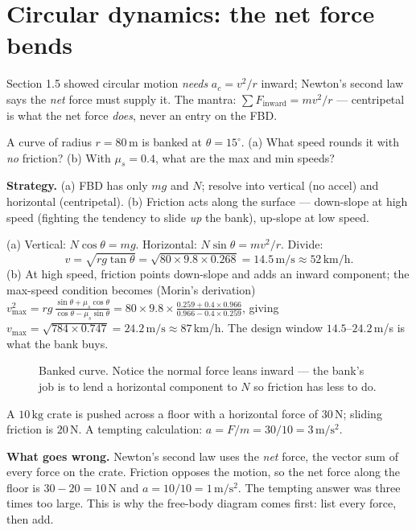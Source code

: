 \section{Circular dynamics: the net force bends}\label{sec:new-circ}

Section 1.5 showed circular motion \emph{needs} $a_c=v^{2}/r$ inward;
Newton's second law says the \emph{net} force must supply it. The mantra:
$\sum F_{\mathrm{inward}}=mv^{2}/r$ --- centripetal is what the net force
\emph{does}, never an entry on the FBD.

\begin{example}\label{ex:banked}
A curve of radius $r=80\,\mathrm{m}$ is banked at
$\theta=15^{\circ}$. (a) What speed rounds it with \emph{no} friction?
(b) With $\mu_s=0.4$, what are the max and min speeds?
\par\smallskip
\textbf{Strategy.} (a) FBD has only $mg$ and $N$; resolve into vertical
(no accel) and horizontal (centripetal). (b) Friction acts along the
surface --- down-slope at high speed (fighting the tendency to slide
\emph{up} the bank), up-slope at low speed.
\begin{solution}
(a) Vertical: $N\cos\theta=mg$. Horizontal: $N\sin\theta=mv^{2}/r$.
Divide:
\[
  v=\sqrt{rg\tan\theta}=\sqrt{80\times9.8\times0.268}
   =14.5\,\mathrm{m/s}\approx52\,\mathrm{km/h}.
\]
(b) At high speed, friction points down-slope and adds an inward
component; the max-speed condition becomes (Morin's derivation)
$v_{\max}^{2}=rg\,\frac{\sin\theta+\mu_s\cos\theta}{\cos\theta-\mu_s\sin\theta}
=80\times9.8\times\frac{0.259+0.4\times0.966}{0.966-0.4\times0.259}$,
giving $v_{\max}=\sqrt{784\times0.747}=24.2\,\mathrm{m/s}\approx87$\,km/h.
The design window $14.5$--$24.2$\,m/s is what the bank buys. \checkmark
\end{solution}
\end{example}

\begin{figure}[htbp]\centering

\caption{Banked curve. Notice the normal force leans inward --- the bank's
job is to lend a horizontal component to $N$ so friction has less to do.}
\label{fig:banked}
\end{figure}

\begin{example}\label{ex:naive-net}
A $10\,\mathrm{kg}$ crate is pushed across a floor with a horizontal force of $30\,\mathrm{N}$; sliding friction
is $20\,\mathrm{N}$. A tempting calculation: $a=F/m=30/10=3\,\mathrm{m/s^2}$.
\par\smallskip
\textbf{What goes wrong.} Newton's second law uses the \emph{net} force, the vector sum of every force on the crate.
Friction opposes the motion, so the net force along the floor is $30-20=10\,\mathrm{N}$ and
$a=10/10=1\,\mathrm{m/s^2}$. The tempting answer was three times too large. This is why the free-body diagram
comes first: list every force, then add.
\end{example}

